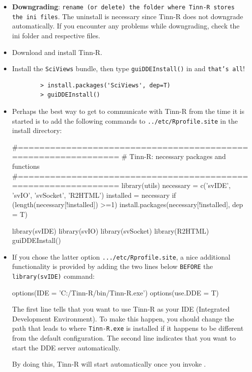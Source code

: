 \begin{itemize}
  \item \textbf{Downgrading}: \texttt{rename (or delete) the folder
      where Tinn-R stores the ini files}. The uninstall is necessary
    since Tinn-R does not downgrade automatically. If you encounter
    any problems while downgrading, check the ini folder and respective
    files.
  \item Download and install Tinn-R.
  \item Install the \texttt{SciViews} bundle, then type
    \texttt{guiDDEInstall()} in \RR{} and \texttt{that's all}!

    \begin{footnotesize}
      \begin{verbatim}
        > install.packages('SciViews', dep=T)
        > guiDDEInstall()
      \end{verbatim}
    \end{footnotesize}

  \item Perhaps the best way to get \RR{} to communicate with
    Tinn-R from the time it is started is to add the
    following commands to \texttt{../etc/Rprofile.site}
    in the \RR{} install directory:

    \begin{Scode}
      #===============================================================
      # Tinn-R: necessary packages and functions
      #===============================================================
      library(utils)
      necessary = c('svIDE', 'svIO', 'svSocket', 'R2HTML')
      installed = necessary %
      if (length(necessary[!installed]) >=1)
      install.packages(necessary[!installed], dep = T)

      library(svIDE)
      library(svIO)
      library(svSocket)
      library(R2HTML)
      guiDDEInstall()
    \end{Scode}

  \item If you chose the latter option \texttt{.../etc/Rprofile.site},
    a nice additional functionality is provided by adding the two
    lines below \texttt{BEFORE} the \texttt{library(svIDE)} command:

    \begin{Scode}
      options(IDE = 'C:/Tinn-R/bin/Tinn-R.exe')
      options(use.DDE = T)
    \end{Scode}

    The first line tells \RR{} that you want to use Tinn-R as your IDE (Integrated
    Development Environment).  To make this happen, you should change the path
    that leads to where \texttt{Tinn-R.exe} is installed if it happens to be
    different from the default configuration. The second line indicates that
    you want to start the DDE server automatically.

    By doing this, Tinn-R will start automatically once you invoke \RR{}.
\end{itemize}



